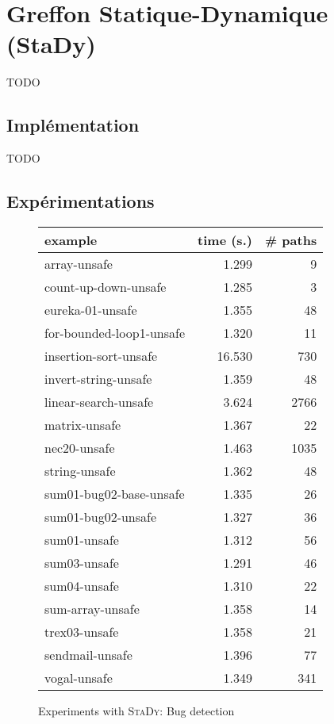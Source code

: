 
\chapter{Greffon Statique-Dynamique (StaDy)}
\label{sec:stady}

\chapterintro

TODO


\section{Implémentation}


TODO


\section{Expérimentations}


\begin{figure}[tb]\scriptsize
  \begin{center}
    \begin{tabular}{lrr}
      \hline
      example & time (s.) & \# paths \\ \hline
      array-unsafe & 1.299 & 9 \\ \hline
      count-up-down-unsafe & 1.285 & 3 \\ \hline
      eureka-01-unsafe & 1.355 & 48 \\ \hline
      for-bounded-loop1-unsafe & 1.320 & 11 \\ \hline
      insertion-sort-unsafe & 16.530 & 730 \\ \hline
      invert-string-unsafe & 1.359 & 48 \\ \hline
      linear-search-unsafe & 3.624 & 2766 \\ \hline
      matrix-unsafe & 1.367 & 22 \\ \hline
      nec20-unsafe & 1.463 & 1035 \\ \hline
      string-unsafe & 1.362 & 48 \\ \hline
      sum01-bug02-base-unsafe & 1.335 & 26 \\ \hline
      sum01-bug02-unsafe & 1.327 & 36 \\ \hline
      sum01-unsafe & 1.312 & 56 \\ \hline
      sum03-unsafe & 1.291 & 46 \\ \hline
      sum04-unsafe & 1.310 & 22 \\ \hline
      sum-array-unsafe & 1.358 & 14 \\ \hline
      trex03-unsafe & 1.358 & 21 \\ \hline
      sendmail-unsafe & 1.396 & 77 \\ \hline
      vogal-unsafe & 1.349 & 341 \\ \hline
    \end{tabular}
  \end{center}
  \vspace{-3mm}
  \caption{Experiments with \textsc{StaDy}: Bug detection}    
  \label{fig:scam-experiments1}
  \vspace{-3mm}
\end{figure}

